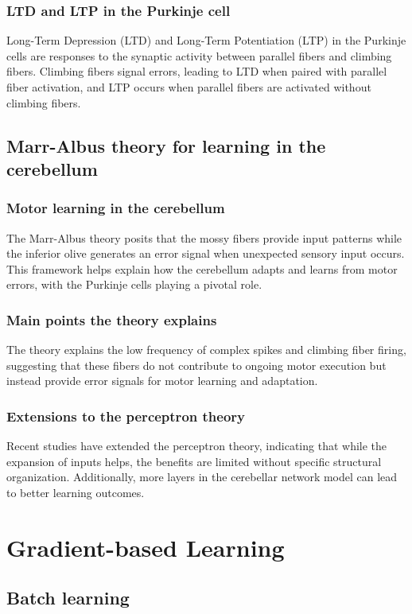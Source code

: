 \documentclass[11pt]{book} %
\begin{document}
\subsubsection{LTD and LTP in the Purkinje cell}
Long-Term Depression (LTD) and Long-Term Potentiation (LTP) in the Purkinje cells are responses to the synaptic activity between parallel fibers and climbing fibers. Climbing fibers signal errors, leading to LTD when paired with parallel fiber activation, and LTP occurs when parallel fibers are activated without climbing fibers.

\subsection{Marr-Albus theory for learning in the cerebellum}

\subsubsection{Motor learning in the cerebellum}
The Marr-Albus theory posits that the mossy fibers provide input patterns while the inferior olive generates an error signal when unexpected sensory input occurs. This framework helps explain how the cerebellum adapts and learns from motor errors, with the Purkinje cells playing a pivotal role.

\subsubsection{Main points the theory explains}
The theory explains the low frequency of complex spikes and climbing fiber firing, suggesting that these fibers do not contribute to ongoing motor execution but instead provide error signals for motor learning and adaptation.

\subsubsection{Extensions to the perceptron theory}
Recent studies have extended the perceptron theory, indicating that while the expansion of inputs helps, the benefits are limited without specific structural organization. Additionally, more layers in the cerebellar network model can lead to better learning outcomes.

\section{Gradient-based Learning}
\subsection{Batch learning}
\end{document}
